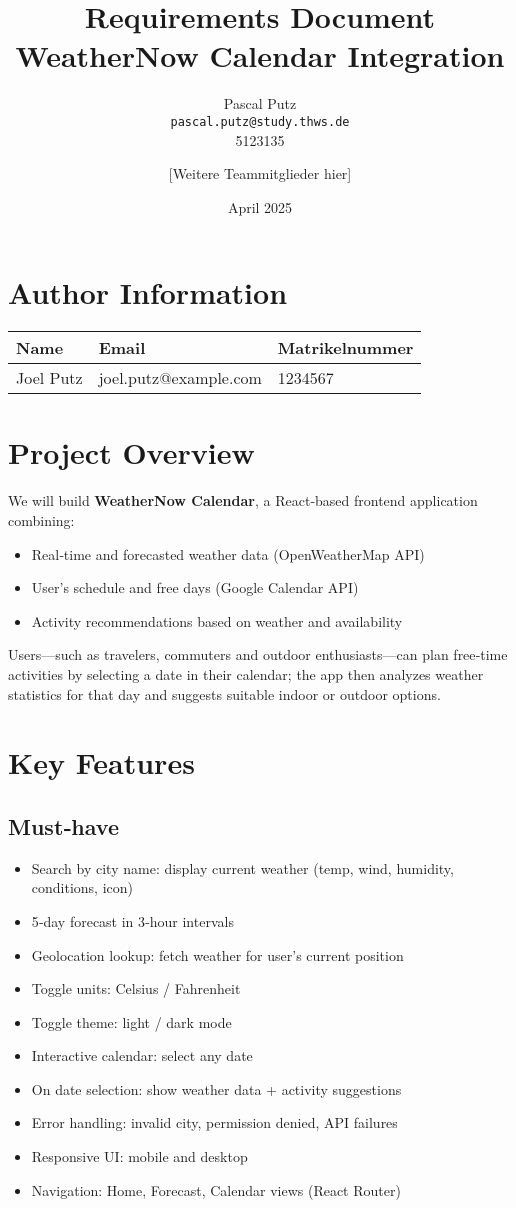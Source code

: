 \documentclass[11pt,a4paper]{article}
\title{Requirements Document\\\large WeatherNow Calendar Integration}
\author{
  Pascal Putz \\ \texttt{pascal.putz@study.thws.de} \\ 5123135
  \and
  [Weitere Teammitglieder hier]
}
\date{April 2025}
\begin{document}
\maketitle

\section{Author Information}
\begin{longtable}{|p{5cm}|p{6cm}|p{3cm}|}
\hline
\textbf{Name} & \textbf{Email} & \textbf{Matrikelnummer} \\
\hline
Joel Putz & joel.putz@example.com & 1234567 \\
\hline
\end{longtable}

\section{Project Overview}
We will build \textbf{WeatherNow Calendar}, a React‑based frontend application combining:
\begin{itemize}[nosep]
  \item Real‑time and forecasted weather data (OpenWeatherMap API)
  \item User’s schedule and free days (Google Calendar API)
  \item Activity recommendations based on weather and availability
\end{itemize}
Users—such as travelers, commuters and outdoor enthusiasts—can plan free‑time activities by selecting a date in their calendar; the app then analyzes weather statistics for that day and suggests suitable indoor or outdoor options.

\section{Key Features}
\subsection*{Must‑have}
\begin{itemize}[nosep]
  \item Search by city name: display current weather (temp, wind, humidity, conditions, icon)
  \item 5‑day forecast in 3‑hour intervals
  \item Geolocation lookup: fetch weather for user’s current position
  \item Toggle units: Celsius / Fahrenheit
  \item Toggle theme: light / dark mode
  \item Interactive calendar: select any date
  \item On date selection: show weather data + activity suggestions
  \item Error handling: invalid city, permission denied, API failures
  \item Responsive UI: mobile and desktop
  \item Navigation: Home, Forecast, Calendar views (React Router)
\end{itemize}
\end{document}
